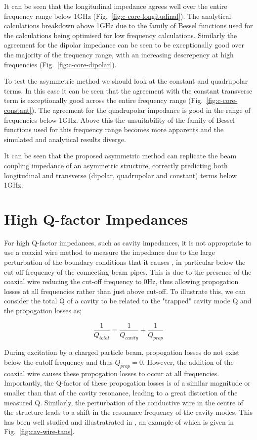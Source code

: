 It can be seen that the longitudinal impedance agrees well over the entire frequency range below 1GHz (Fig.~\ref{fig:c-core-longitudinal}). The analytical calculations breakdown above 1GHz due to the family of Bessel functions used for the calculations being optimised for low frequency calculations. Similarly the agreement for the dipolar impedance can be seen to be exceptionally good over the majority of the frequency range, with an increasing descrepency at high frequencies (Fig.~\ref{fig:c-core-dipolar}).

To test the asymmetric method we should look at the constant and quadrupolar terms. In this case it can be seen that the agreement with the constant transverse term is exceptionally good across the entire frequency range (Fig.~\ref{fig:c-core-constant}). The agreement for the quadrupolar impedance is good in the range of frequencies below 1GHz. Above this the unsuitability of the family of Bessel functions used for this frequency range becomes more apparents and the simulated and analytical results diverge.

It can be seen that the proposed asymmetric method can replicate the beam coupling impedance of an asymmetric structure, correctly predicting both longitudinal and transverse (dipolar, quadrupolar and constant) terms below 1GHz. 

\section{High Q-factor Impedances}

For high Q-factor impedances, such as cavity impedances, it is not appropriate to use a coaxial wire method to measure the impedance due to the large perturbation of the boundary conditions that it causes \cite{Masullo:StretchedWire}, in particular below the cut-off frequency of the connecting beam pipes. This is due to the presence of the coaxial wire reducing the cut-off frequency to 0Hz, thus allowing propogation losses at all frequencies rather than just above cut-off. To illustrate this, we can consider the total Q of a cavity to be related to the "trapped" cavity mode Q and the propogation losses as;

\begin{equation}
\frac{1}{Q_{total}} = \frac{1}{Q_{cavity}} + \frac{1}{Q_{prop}}
\end{equation}

During excitation by a charged particle beam, propogation losses do not exist below the cutoff frequency and thus $Q_{prop} = 0$. However, the addition of the coaxial wire causes these propogation losses to occur at all frequencies. Importantly, the Q-factor of these propogation losses is of a similar magnitude or smaller than that of the cavity resonance, leading to a great distortion of the measured Q. Similarly, the perturbation of the conductive wire in the centre of the structure leads to a shift in the resonance frequency of the cavity modes.  This has been well studied and illustratrated in \cite{Masullo:StretchedWire}, an example of which is given in Fig.~\ref{fig:cav-wire-tans}.


